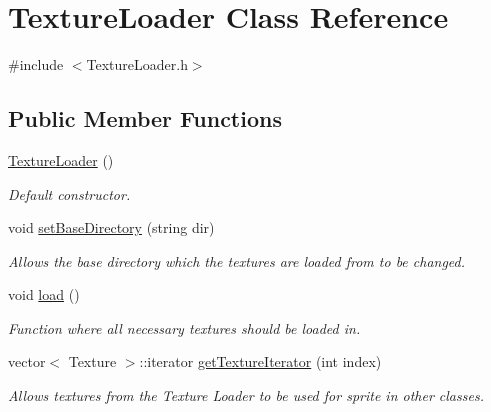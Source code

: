 \hypertarget{class_texture_loader}{}\section{Texture\+Loader Class Reference}
\label{class_texture_loader}


{\ttfamily \#include $<$Texture\+Loader.\+h$>$}

\subsection*{Public Member Functions}
\begin{DoxyCompactItemize}
\item 
\hyperlink{class_texture_loader_aafa6ca3bdbee3874a73aafae39d5c804}{Texture\+Loader} ()
\begin{DoxyCompactList}\small\item\em Default constructor. \end{DoxyCompactList}\item 
void \hyperlink{class_texture_loader_a8c6ef2773da422d2b40a98e839c0ccf8}{set\+Base\+Directory} (string dir)
\begin{DoxyCompactList}\small\item\em Allows the base directory which the textures are loaded from to be changed. \end{DoxyCompactList}\item 
void \hyperlink{class_texture_loader_a887d3fd9f794498a8273f65d994e9250}{load} ()
\begin{DoxyCompactList}\small\item\em Function where all necessary textures should be loaded in. \end{DoxyCompactList}\item 
vector$<$ Texture $>$\+::iterator \hyperlink{class_texture_loader_aa579911f752f74d993459639b326ed41}{get\+Texture\+Iterator} (int index)
\begin{DoxyCompactList}\small\item\em Allows textures from the Texture Loader to be used for sprite in other classes. \end{DoxyCompactList}\end{DoxyCompactItemize}

